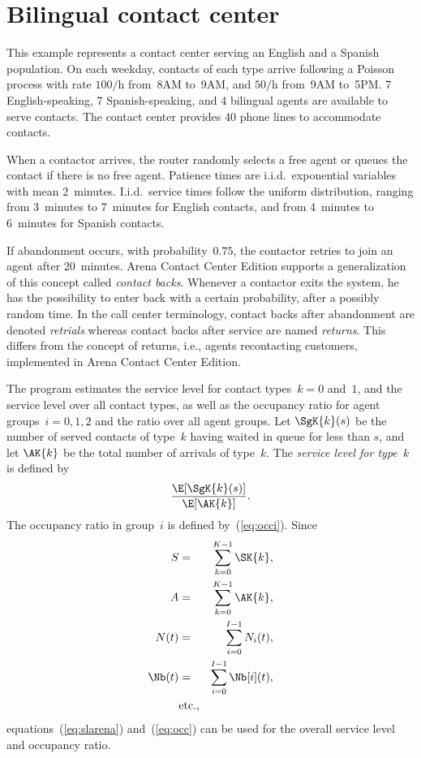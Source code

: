 \section{Bilingual contact center}
\label{sec:Bilingual}

This example represents a contact center serving an English and
a Spanish population.  On each weekday, contacts of each type arrive
following a Poisson process with rate $100/$h from~8AM to~9AM, and
$50/$h from~9AM to~5PM.
7 English-speaking, 7 Spanish-speaking, and 4
bilingual agents are available to serve contacts.  The contact
center provides 40 phone lines to accommodate contacts.

When a contactor
arrives, the router randomly selects a free agent or queues the
contact if there is no free agent.
Patience times are i.i.d.\ exponential variables
with mean 2~minutes.  I.i.d.\ service times follow the uniform distribution,
ranging from 3~minutes to
7~minutes for English contacts, and from 4~minutes to 6~minutes for
Spanish contacts.

If abandonment occurs, with probability~$0.75$,
the contactor retries to join an agent after 20~minutes.
Arena Contact Center Edition supports a generalization of this concept
called \emph{contact backs}.  Whenever a contactor exits the system, he
has the possibility to enter back with a certain probability, after a
possibly random time.  In the call center terminology, contact backs
after abandonment are denoted \emph{retrials} whereas contact backs
after service are named \emph{returns}.  This differs from the concept
of returns, i.e., agents recontacting customers, implemented in Arena
Contact Center Edition.

The program estimates the service level for contact types~$k=0$
and~$1$,
and the service level over
all contact types, as well as the occupancy ratio for agent
groups~$i=0,1,2$ and the ratio over all agent groups.
Let $\SgK{k}(s)$ be the number of served contacts of
type~$k$ having waited in queue for less than $s$, and let $\AK{k}$
be the total number of arrivals of type~$k$.
The \emph{service level for type~$k$} is defined by
\begin{equation}
\frac{\E[\SgK{k}(s)]}{\E[\AK{k}]}.\label{eq:slarenak}
\end{equation}
The occupancy ratio in group~$i$ is defined by~(\ref{eq:occi}).
Since
\begin{eqnarray*}
S&=&\sum_{k=0}^{K-1} \SK{k},\\
A&=&\sum_{k=0}^{K-1} \AK{k},\\
N(t)&=&\sum_{i=0}^{I-1} N_i(t),\\
\Nb(t)&=&\sum_{i=0}^{I-1} \Nb[i](t),\\
&\mbox{etc.,}&
\end{eqnarray*}
equations~(\ref{eq:slarena}) and~(\ref{eq:occ}) can be used for
the overall service level and occupancy ratio.

